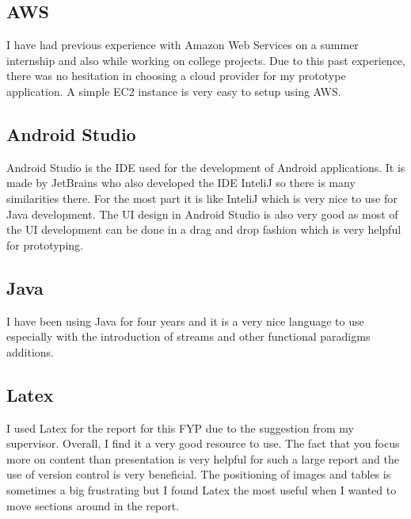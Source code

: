 \subsection{AWS}
I have had previous experience with Amazon Web Services on a summer internship and also while working on college projects.
Due to this past experience, there was no hesitation in choosing a cloud provider for my prototype application.
A simple EC2 instance is very easy to setup using AWS.

\subsection{Android Studio}
Android Studio is the IDE used for the development of Android applications.
It is made by JetBrains who also developed the IDE InteliJ so there is many similarities there.
For the most part it is like InteliJ which is very nice to use for Java development.
The UI design in Android Studio is also very good as most of the UI development can be done in a drag and drop fashion which is very helpful for prototyping.

\subsection{Java}
I have been using Java for four years and it is a very nice language to use especially with the introduction of streams and other functional paradigms additions.

\subsection{Latex}
I used Latex for the report for this FYP due to the suggestion from my supervisor.
Overall, I find it a very good resource to use.
The fact that you focus more on content than presentation is very helpful for such a large report and the use of version control is very beneficial.
The positioning of images and tables is sometimes a big frustrating but I found Latex the most useful when I wanted to move sections around in the report.